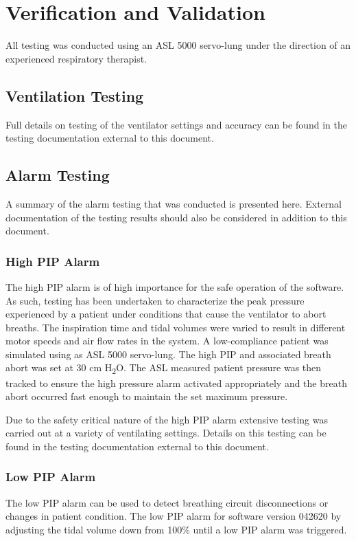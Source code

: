 \documentclass[]{article}
\begin{document}
\clearpage
\section{Verification and Validation}
\label{sect:vandv}


All testing was conducted using an ASL 5000 servo-lung under the direction of an experienced respiratory therapist.

\subsection{Ventilation Testing}

Full details on testing of the ventilator settings and accuracy can be found in the testing documentation external to this document.


\subsection{Alarm Testing}

A summary of the alarm testing that was conducted is presented here.  External documentation of the testing results should also be considered in addition to this document.

\subsubsection{High PIP Alarm}
The high PIP alarm is of high importance for the safe operation of the software.  As such, testing has been undertaken to characterize the peak pressure experienced by a patient under conditions that cause the ventilator to abort breaths.  The inspiration time and tidal volumes were varied to result in different motor speeds and air flow rates in the system.  A low-compliance patient was simulated using as ASL 5000 servo-lung.  The high PIP and associated breath abort was set at 30 cm H\textsubscript{2}O.  The ASL measured patient pressure was then tracked to ensure the high pressure alarm activated appropriately and the breath abort occurred fast enough to maintain the set maximum pressure.

Due to the safety critical nature of the high PIP alarm extensive testing was carried out at a variety of ventilating settings.  Details on this testing can be found in the testing documentation external to this document.


\subsubsection{Low PIP Alarm}
The low PIP alarm can be used to detect breathing circuit disconnections or changes in patient condition.  The low PIP alarm for software version 042620 by adjusting the tidal volume down from 100\% until a low PIP alarm was triggered.  
\end{document}
